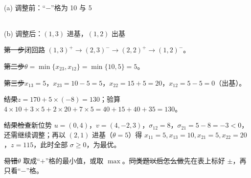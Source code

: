 \begin{center}
\begin{minipage}{0.48\linewidth}\centering
{}\\{\small (a) 调整前：“$-$”格为 10 与 5}
\end{minipage}\hfill
\begin{minipage}{0.48\linewidth}\centering
{}\\{\small (b) 调整后：$(1,3)$ 进基，$(1,2)$ 出基}
\end{minipage}
\end{center}
\st{第一步}闭回路 $(1,3)^+\to(2,3)^-\to(2,2)^+\to(1,2)^-$。\par
\st{第二步}$\theta=\min\{x_{23},x_{12}\}=\min\{10,5\}=5$。\par
\st{第三步}$x_{13}=5$，$x_{23}=10-5=5$，$x_{22}=15+5=20$，$x_{12}=5-5=0$（出基）。\par
\st{结果}$z=170+5\times(-8)=130$；验算 $4\times10+3\times5+2\times20+7\times5=40+15+40+35=130$。\par
\st{结果检查}\supp 新位势 $u=(0,4)$，$v=(4,-2,3)$，$\sigma_{12}=8$，$\sigma_{21}=5-8=-3<0$，还需继续调整；再以 $(2,1)$ 进基（$\theta=5$）得 $x_{11}=5,x_{13}=10,x_{21}=5,x_{22}=20$，$z=115$，此时全部 $\sigma\ge0$，为最优。\par
\st{易错}$\theta$ 取成“$+$”格的最小值，或取 $\max$。\quad\st{同类题以后怎么做}先在表上标好 $\pm$，再只看“$-$”格。



